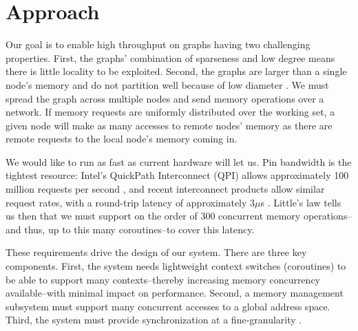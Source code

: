\documentclass{acm_proc_article-sp}
\begin{document}
\begin {comment}
\todo{ discussion of coroutines \& synchronization } Were a coroutine to
block on a synchronization variable shared with other threads, the
entire fray would suspend execution.  This can lead to deadlock when,
for example, one coroutine waits to consume from another thread that
is waiting to consume what only another coroutine in this first fray
can produce.  Instead, coroutines must yield on failed synchronization
events, spinning rather than blocking, where were they bona fide
threads, blocking might be more efficient.

\todo{ say something about ``synchronization'' within a fray }

Coroutines completing their work yield without adding themselves to
the scheduling queue.  The last coroutine to exit in this way returns
as the main thread, as in the common  fork-join model of parallelism.

\end{comment}

\section{Approach}
\label{sec:approach}

Our goal is to enable high throughput on graphs having two challenging
properties. First, the graphs' combination of sparseness and low
degree means there is little locality to be exploited. Second, the
graphs are larger than a single node's memory and do not partition
well because of low diameter . We must spread the graph across multiple nodes
and send memory operations over a network. If memory requests are
uniformly distributed over the working set, a given node will make as
many accesses to remote nodes' memory as there are remote requests to the local node's memory coming in.

We would like to run as fast as current hardware will let us. Pin
bandwidth is the tightest resource: Intel's QuickPath Interconnect
(QPI) allows approximately 100 million requests per second
\cite{quickpath:website} , and recent interconnect products allow similar request
rates, with a round-trip latency of approximately 3$\mu$s
. Little's law tells us then that we must support on the
order of 300 concurrent memory operations--and thus, up to this many coroutines--to
cover this latency.

These requirements drive the design of our system. There are three key
components. First, the system needs lightweight context switches (coroutines) to be able to support many contexts--thereby increasing memory concurrency available--with minimal impact on performance. Second, a memory management subsystem must support many concurrent accesses to a global address space. Third, the system must provide synchronization at a fine-granularity .
\end{document}
